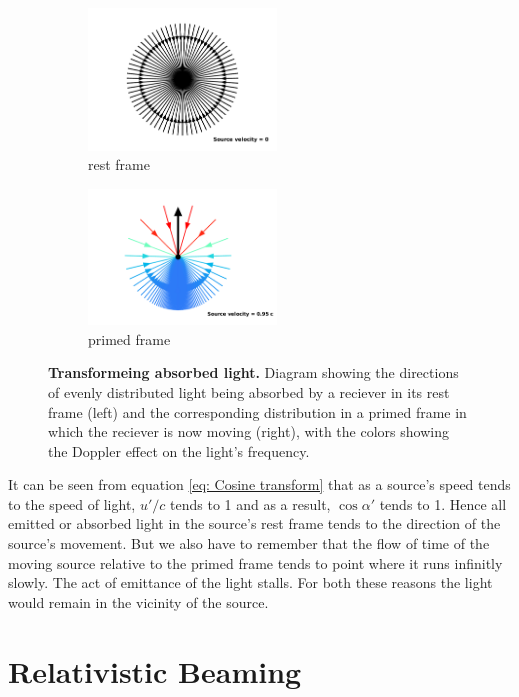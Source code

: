 \begin{figure}[H]
	\begin{subfigure}{.49\textwidth}
		\centering
		\includegraphics[width = 5cm]{images/pdf/Aberrated_velocities_inwards_restframe.pdf}
		\caption{rest frame}
	\end{subfigure}
	\begin{subfigure}{.49\textwidth}
		\centering
		\includegraphics[width = 5cm]{images/pdf/Aberrated_velocities_inwards.pdf}
		\caption{primed frame}
	\end{subfigure}
	\caption{\textbf{Transformeing absorbed light.} Diagram showing the directions of evenly distributed light being absorbed by a reciever in its rest frame (left) and the corresponding distribution in a primed frame in which the reciever is now moving (right), with the colors showing the Doppler effect on the light's frequency.}
	\label{fig: aberrated absorbed light}
\end{figure}

It can be seen from equation \eqref{eq: Cosine transform} that as a source's speed tends to the speed of light, $u'/c$ tends to 1 and as a result, $\cos\alpha{'}$ tends to 1.
Hence all emitted or absorbed light in the source's rest frame tends to the direction of the source's movement.
But we also have to remember that the flow of time of the moving source relative to the primed frame tends to point where it runs infinitly slowly.
The act of emittance of the light stalls.
For both these reasons the light would remain in the vicinity of the source.

\section{Relativistic Beaming} \label{sect: Relativistic Beaming}


